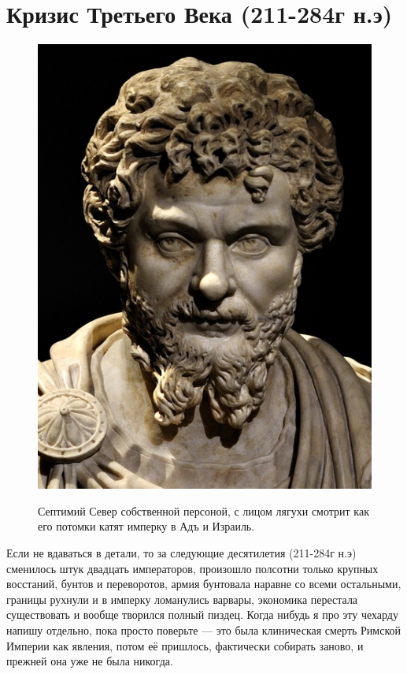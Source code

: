 \section{Кризис Третьего Века (211-284г н.э)}
\begin{figure}[h!tb]
	\centering\includegraphics[scale=0.5]{Relig_gambit/157293210416964768.png}
	\label{fig:gambit3} %
	\caption{Септимий Север собственной персоной, с лицом лягухи смотрит как его потомки катят имперку в Адъ и Израиль. 	}
\end{figure}

Если не вдаваться в детали, то за следующие десятилетия (211-284г н.э) сменилось штук двадцать императоров, произошло полсотни только крупных восстаний, бунтов и переворотов, армия бунтовала наравне со всеми остальными, границы рухнули и в имперку ломанулись варвары, экономика перестала существовать и вообще творился полный пиздец. Когда нибудь я про эту чехарду напишу отдельно, пока просто поверьте — это была клиническая смерть Римской Империи как явления, потом её пришлось, фактически собирать заново, и прежней она уже не была никогда.


